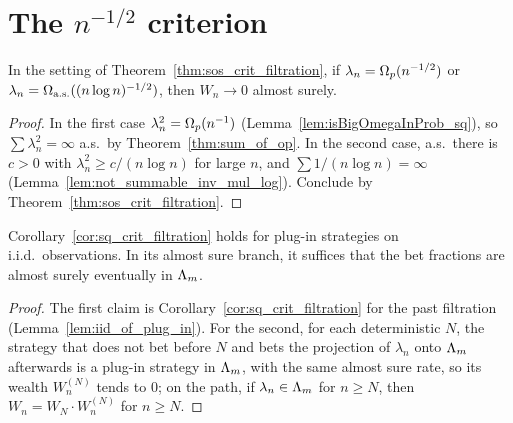 \section{\texorpdfstring{The $n^{-1/2}$ criterion}{The n to the -1/2 criterion}}

\begin{corollary}
  \label{cor:sq_crit_filtration}
  \leanok
  In the setting of Theorem~\ref{thm:sos_crit_filtration}, if $\lambda_n = \Omega_p(n^{-1/2})$ or
  $\lambda_n = \Omega_{\mathrm{a.s.}}((n \log n)^{-1/2})$, then $W_n \to 0$ almost surely.
\end{corollary}

\begin{proof}
  \leanok
  In the first case $\lambda_n^2 = \Omega_p(n^{-1})$ (Lemma~\ref{lem:isBigOmegaInProb_sq}), so
  $\sum \lambda_n^2 = \infty$ a.s.\ by Theorem~\ref{thm:sum_of_op}. In the second case, a.s.\ there
  is $c > 0$ with $\lambda_n^2 \ge c/(n \log n)$ for large $n$, and $\sum 1/(n\log n) = \infty$
  (Lemma~\ref{lem:not_summable_inv_mul_log}). Conclude by Theorem~\ref{thm:sos_crit_filtration}.
\end{proof}

\begin{lemma}
  \label{lem:plugin_criterion}
  \leanok
  Corollary~\ref{cor:sq_crit_filtration} holds for plug-in strategies on i.i.d.\ observations. In
  its almost sure branch, it suffices that the bet fractions are almost surely eventually in
  $\Lambda_m$.
\end{lemma}

\begin{proof}
  \leanok
  The first claim is Corollary~\ref{cor:sq_crit_filtration} for the past filtration
  (Lemma~\ref{lem:iid_of_plug_in}). For the second, for each deterministic $N$, the strategy that
  does not bet before $N$ and bets the projection of $\lambda_n$ onto $\Lambda_m$ afterwards is a plug-in
  strategy in $\Lambda_m$, with the same almost sure rate, so its wealth $W^{(N)}_n$ tends to $0$; on the
  path, if $\lambda_n \in \Lambda_m$ for $n \ge N$, then $W_n = W_N \cdot W^{(N)}_n$ for $n \ge N$.
\end{proof}

